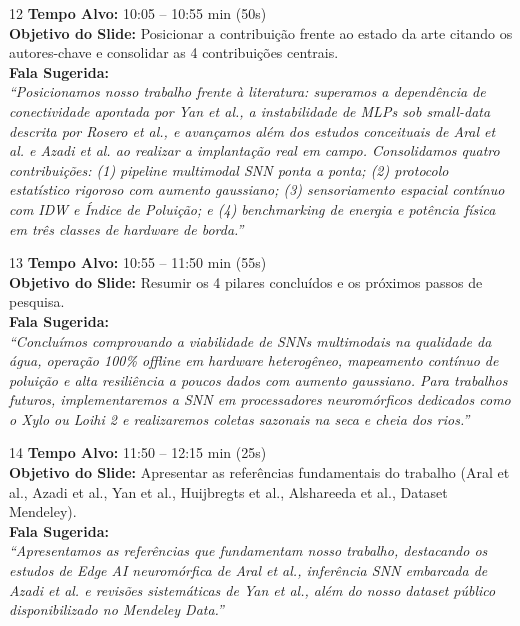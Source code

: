 \documentclass[11pt,a4paper]{article}
\begin{document}
\begin{slidebox}{12}
\textbf{Tempo Alvo:} 10:05 -- 10:55 min (50s)\\[3pt]
\textbf{Objetivo do Slide:} Posicionar a contribuição frente ao estado da arte citando os autores-chave e consolidar as 4 contribuições centrais.\\[3pt]
\textbf{Fala Sugerida:}\\
\textit{``Posicionamos nosso trabalho frente à literatura: superamos a dependência de conectividade apontada por Yan et al., a instabilidade de MLPs sob small-data descrita por Rosero et al., e avançamos além dos estudos conceituais de Aral et al. e Azadi et al. ao realizar a implantação real em campo. Consolidamos quatro contribuições: (1) pipeline multimodal SNN ponta a ponta; (2) protocolo estatístico rigoroso com aumento gaussiano; (3) sensoriamento espacial contínuo com IDW e Índice de Poluição; e (4) benchmarking de energia e potência física em três classes de hardware de borda.''}
\end{slidebox}

\begin{slidebox}{13}
\textbf{Tempo Alvo:} 10:55 -- 11:50 min (55s)\\[3pt]
\textbf{Objetivo do Slide:} Resumir os 4 pilares concluídos e os próximos passos de pesquisa.\\[3pt]
\textbf{Fala Sugerida:}\\
\textit{``Concluímos comprovando a viabilidade de SNNs multimodais na qualidade da água, operação 100\% offline em hardware heterogêneo, mapeamento contínuo de poluição e alta resiliência a poucos dados com aumento gaussiano. Para trabalhos futuros, implementaremos a SNN em processadores neuromórficos dedicados como o Xylo ou Loihi 2 e realizaremos coletas sazonais na seca e cheia dos rios.''}
\end{slidebox}

\begin{slidebox}{14}
\textbf{Tempo Alvo:} 11:50 -- 12:15 min (25s)\\[3pt]
\textbf{Objetivo do Slide:} Apresentar as referências fundamentais do trabalho (Aral et al., Azadi et al., Yan et al., Huijbregts et al., Alshareeda et al., Dataset Mendeley).\\[3pt]
\textbf{Fala Sugerida:}\\
\textit{``Apresentamos as referências que fundamentam nosso trabalho, destacando os estudos de Edge AI neuromórfica de Aral et al., inferência SNN embarcada de Azadi et al. e revisões sistemáticas de Yan et al., além do nosso dataset público disponibilizado no Mendeley Data.''}
\end{slidebox}
\end{document}
